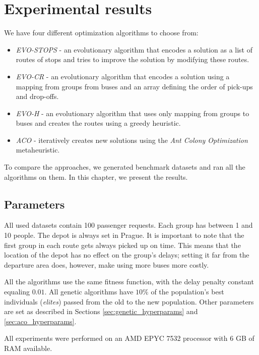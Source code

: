 \chapter{Experimental results}\label{ch:experiments}

We have four different optimization algorithms to choose from:
\begin{itemize}
    \item \textit{EVO-STOPS} - an evolutionary algorithm that encodes a solution as a list of routes of stops and tries to improve the solution by modifying these routes.
    \item \textit{EVO-CR} - an evolutionary algorithm that encodes a solution using a mapping from groups from buses and an array defining the order of pick-ups and drop-offs.
    \item \textit{EVO-H} - an evolutionary algorithm that uses only mapping from groups to buses and creates the routes using a greedy heuristic.
    \item \textit{ACO} - iteratively creates new solutions using the \textit{Ant Colony Optimization} metaheuristic.
\end{itemize}

To compare the approaches, we generated benchmark datasets and ran all the algorithms on them. In this chapter, we present the results.

\section{Parameters}

All used datasets contain 100 passenger requests. Each group has between 1 and 10 people. The depot is always set in Prague. It is important to note that the first group in each route gets always picked up on time. This means that the location of the depot has no effect on the group's delays; setting it far from the departure area does, however, make using more buses more costly.

All the algorithms use the same fitness function, with the delay penalty constant equaling $0.01$. All genetic algorithms have $10\%$ of the population's best individuals (\textit{elites}) passed from the old to the new population. Other parameters are set as described in Sections \ref{sec:genetic_hyperparams} and \ref{sec:aco_hyperparams}.

All experiments were performed on an AMD EPYC 7532 processor with 6 GB of RAM available.

